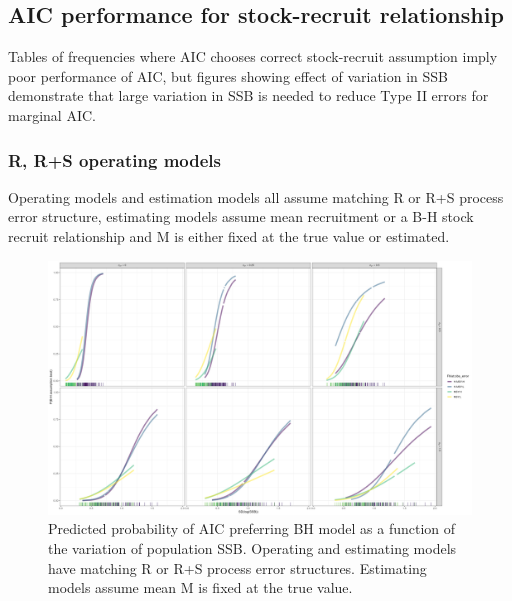 \documentclass[
  12pt,
]{article}
\begin{document}
\clearpage

\hypertarget{aic-performance-for-stock-recruit-relationship}{%
\subsection*{AIC performance for stock-recruit
relationship}\label{aic-performance-for-stock-recruit-relationship}}

Tables of frequencies where AIC chooses correct stock-recruit assumption
imply poor performance of AIC, but figures showing effect of variation
in SSB demonstrate that large variation in SSB is needed to reduce Type
II errors for marginal AIC.

\hypertarget{r-rs-operating-models-2}{%
\subsubsection*{R, R+S operating models}\label{r-rs-operating-models-2}}

\begin{table}
\caption{Operating models and estimation models all assume matching R or R+S process error structure, estimating models assume mean recruitment or a B-H stock recruit relationship and M is either fixed at the true value or estimated.}
{}
\end{table}

\begin{figure}
\caption{Predicted probability of AIC preferring BH model as a function of the variation of population SSB. Operating and estimating models have matching R or R+S process error structures. Estimating models assume mean M is fixed at the true value.}\label{naa_om_MF_BH_glm_AIC_plots}
\begin{center}
\includegraphics[width = \textwidth]{naa_om_MF_pred_BH_best.png}
\end{center}
\end{figure}
\end{document}
